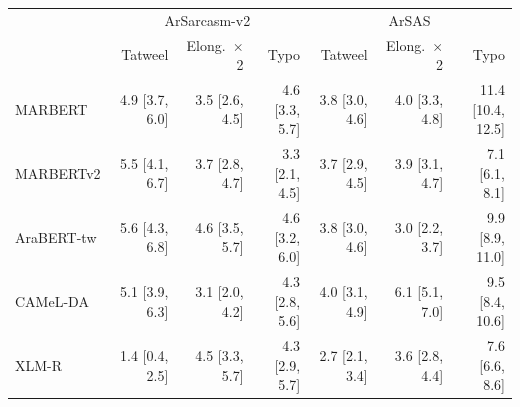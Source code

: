 \begin{tabular}{lrrrrrr}
\toprule
 & \multicolumn{3}{c}{ArSarcasm-v2} & \multicolumn{3}{c}{ArSAS} \\
 & Tatweel & Elong.\ $\times$2 & Typo & Tatweel & Elong.\ $\times$2 & Typo \\
\midrule
MARBERT & 4.9 {\scriptsize[3.7, 6.0]} & 3.5 {\scriptsize[2.6, 4.5]} & 4.6 {\scriptsize[3.3, 5.7]} & 3.8 {\scriptsize[3.0, 4.6]} & 4.0 {\scriptsize[3.3, 4.8]} & 11.4 {\scriptsize[10.4, 12.5]} \\
MARBERTv2 & 5.5 {\scriptsize[4.1, 6.7]} & 3.7 {\scriptsize[2.8, 4.7]} & 3.3 {\scriptsize[2.1, 4.5]} & 3.7 {\scriptsize[2.9, 4.5]} & 3.9 {\scriptsize[3.1, 4.7]} & 7.1 {\scriptsize[6.1, 8.1]} \\
AraBERT-tw & 5.6 {\scriptsize[4.3, 6.8]} & 4.6 {\scriptsize[3.5, 5.7]} & 4.6 {\scriptsize[3.2, 6.0]} & 3.8 {\scriptsize[3.0, 4.6]} & 3.0 {\scriptsize[2.2, 3.7]} & 9.9 {\scriptsize[8.9, 11.0]} \\
CAMeL-DA & 5.1 {\scriptsize[3.9, 6.3]} & 3.1 {\scriptsize[2.0, 4.2]} & 4.3 {\scriptsize[2.8, 5.6]} & 4.0 {\scriptsize[3.1, 4.9]} & 6.1 {\scriptsize[5.1, 7.0]} & 9.5 {\scriptsize[8.4, 10.6]} \\
XLM-R & 1.4 {\scriptsize[0.4, 2.5]} & 4.5 {\scriptsize[3.3, 5.7]} & 4.3 {\scriptsize[2.9, 5.7]} & 2.7 {\scriptsize[2.1, 3.4]} & 3.6 {\scriptsize[2.8, 4.4]} & 7.6 {\scriptsize[6.6, 8.6]} \\
\bottomrule
\end{tabular}
